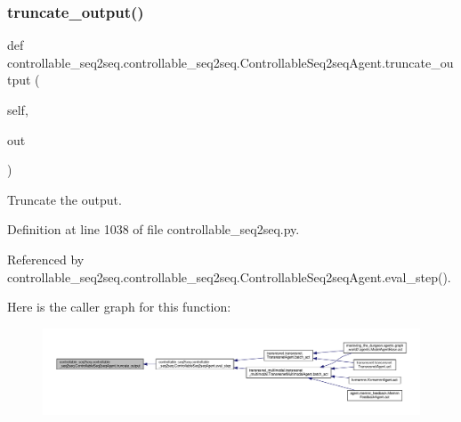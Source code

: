 \subsubsection{\texorpdfstring{truncate\+\_\+output()}{truncate\_output()}}
{\footnotesize\ttfamily def controllable\+\_\+seq2seq.\+controllable\+\_\+seq2seq.\+Controllable\+Seq2seq\+Agent.\+truncate\+\_\+output (\begin{DoxyParamCaption}\item[{}]{self,  }\item[{}]{out }\end{DoxyParamCaption})}

\begin{DoxyVerb}Truncate the output.\end{DoxyVerb}
 

Definition at line 1038 of file controllable\+\_\+seq2seq.\+py.



Referenced by controllable\+\_\+seq2seq.\+controllable\+\_\+seq2seq.\+Controllable\+Seq2seq\+Agent.\+eval\+\_\+step().

Here is the caller graph for this function\+:
\nopagebreak
\begin{figure}[H]
\begin{center}
\leavevmode
\includegraphics[width=350pt]{classcontrollable__seq2seq_1_1controllable__seq2seq_1_1ControllableSeq2seqAgent_a9f1de6132ddaf0b2c9a197617e08eac6_icgraph}
\end{center}
\end{figure}
\mbox{\label{classcontrollable__seq2seq_1_1controllable__seq2seq_1_1ControllableSeq2seqAgent_a22b034e548a14336673b88c665bd2bcf}} 
